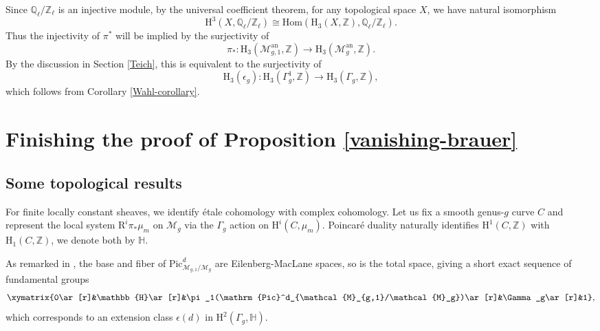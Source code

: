\documentclass[12pt]{amsart}
\newtheorem{lemma}{Lemma}
\begin{document}
Since $\mathbb{Q}_\ell/\mathbb{Z}_\ell$ is an injective module, by the universal coefficient theorem, for any topological space $X$, we have natural isomorphism $$\mathrm{H}^3(X,\mathbb{Q}_\ell/\mathbb{Z}_\ell)\cong\mathrm{Hom}(\mathrm{H}_3(X,\mathbb{Z}),\mathbb{Q}_\ell/\mathbb{Z}_\ell).$$
Thus the injectivity of $\pi^*$ will be implied by the surjectivity of $$\pi_*\colon \mathrm{H}_3(\mathcal{M}^{\mathrm{an}}_{g,1},\mathbb{Z})\to\mathrm{H}_3(\mathcal{M}_{g}^{\mathrm{an}},\mathbb{Z}).$$ By the discussion in Section \ref{Teich}, this is equivalent to the surjectivity of $$\mathrm{H}_3(\epsilon_g)\colon\mathrm{H}_3(\Gamma_g^1,\mathbb{Z})\to\mathrm{H}_3(\Gamma_g,\mathbb{Z}),$$ which follows from Corollary \ref{Wahl-corollary}. 

\section{Finishing the proof of Proposition \ref{vanishing-brauer}}\label{finish-proof}
\subsection{Some topological results}
For finite locally constant sheaves, we identify \'etale cohomology with complex cohomology. Let us fix a smooth genus-$g$ curve $C$ and represent the local system $\mathrm{R}^i\pi_*\mu_m$ on $\mathcal{M}_g$ via the $\Gamma_g$ action on $\mathrm{H}^i(C,\mu_m)$. Poincar\'e duality naturally identifies  $\mathrm{H}^1(C,\mathbb{Z})$ with  $\mathrm{H}_1(C,\mathbb{Z})$, we denote both by $\mathbb{H}$. 

As remarked in \cite[Corollary 22]{zbMATH01590471}, the base and fiber of $\mathrm{Pic}^d_{\mathcal{M}_{g,1}/\mathcal{M}_{g}}$ are Eilenberg-MacLane spaces, so is the total space, giving a short exact sequence of fundamental groups $$\xymatrix{0\ar[r]&\mathbb{H}\ar[r]&\pi_1(\mathrm{Pic}^d_{\mathcal{M}_{g,1}/\mathcal{M}_g})\ar[r]&\Gamma_g\ar[r]&1},$$ which corresponds to an extension class $\epsilon(d)$ in $\mathrm{H}^2(\Gamma_g,\mathbb{H})$. 
\end{document}
